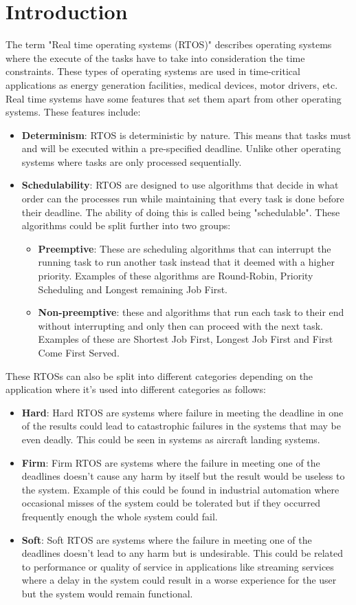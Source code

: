 \documentclass[conference]{IEEEtran}
\begin{document}
\section{Introduction}
The term "Real time operating systems (RTOS)" describes operating systems where the execute of the tasks have to take into consideration the time constraints. These types of operating systems are used in time-critical applications as energy generation facilities, medical devices, motor drivers, etc. Real time systems have some features that set them apart from other operating systems. These features include:
\begin{itemize}
    \item \textbf{Determinism}: RTOS is deterministic by nature. This means that tasks must and will be executed within a pre-specified deadline. Unlike other operating systems where tasks are only processed sequentially.
    \item \textbf{Schedulability}: RTOS are designed to use algorithms that decide in what order can the processes run while maintaining that every task is done before their deadline. The ability of doing this is called being "schedulable". These algorithms could be split further into two groups:
    \begin{itemize}
        \item \textbf{Preemptive}: These are scheduling algorithms that can interrupt the running task to run another task instead that it deemed with a higher priority. Examples of these algorithms are Round-Robin, Priority Scheduling and Longest remaining Job First.
        \item \textbf{Non-preemptive}: these and algorithms that run each task to their end without interrupting and only then can proceed with the next task. Examples of these are Shortest Job First, Longest Job First and First Come First Served.
    \end{itemize}
\end{itemize}
These RTOSs can also be split into different categories depending on the application where it's used into different categories as follows: 
\begin{itemize}
    \item \textbf{Hard}: Hard RTOS are systems where failure in meeting the deadline in one of the results could lead to catastrophic failures in the systems that may be even deadly. This could be seen in systems as aircraft landing systems.
    \item \textbf{Firm}: Firm RTOS are systems where the failure in meeting one of the deadlines doesn't cause any harm by itself but the result would be useless to the system. Example of this could be found in industrial automation where occasional misses of the system could be tolerated but if they occurred frequently enough the whole system could fail.
    \item \textbf{Soft}: Soft RTOS are systems where the failure in meeting one of the deadlines doesn't lead to any harm but is undesirable. This could be related to performance or quality of service in applications like streaming services where a delay in the system could result in a worse experience for the user but the system would remain functional.
\end{itemize}
\end{document}
